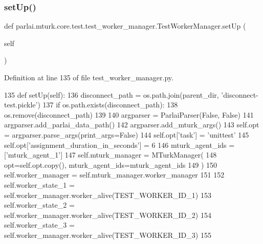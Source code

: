 \subsubsection{\texorpdfstring{set\+Up()}{setUp()}}
{\footnotesize\ttfamily def parlai.\+mturk.\+core.\+test.\+test\+\_\+worker\+\_\+manager.\+Test\+Worker\+Manager.\+set\+Up (\begin{DoxyParamCaption}\item[{}]{self }\end{DoxyParamCaption})}



Definition at line 135 of file test\+\_\+worker\+\_\+manager.\+py.


\begin{DoxyCode}
135     \textcolor{keyword}{def }setUp(self):
136         disconnect\_path = os.path.join(parent\_dir, \textcolor{stringliteral}{'disconnect-test.pickle'})
137         \textcolor{keywordflow}{if} os.path.exists(disconnect\_path):
138             os.remove(disconnect\_path)
139 
140         argparser = ParlaiParser(\textcolor{keyword}{False}, \textcolor{keyword}{False})
141         argparser.add\_parlai\_data\_path()
142         argparser.add\_mturk\_args()
143         self.opt = argparser.parse\_args(print\_args=\textcolor{keyword}{False})
144         self.opt[\textcolor{stringliteral}{'task'}] = \textcolor{stringliteral}{'unittest'}
145         self.opt[\textcolor{stringliteral}{'assignment\_duration\_in\_seconds'}] = 6
146         mturk\_agent\_ids = [\textcolor{stringliteral}{'mturk\_agent\_1'}]
147         self.mturk\_manager = MTurkManager(
148             opt=self.opt.copy(), mturk\_agent\_ids=mturk\_agent\_ids
149         )
150         self.worker\_manager = self.mturk\_manager.worker\_manager
151 
152         self.worker\_state\_1 = self.worker\_manager.worker\_alive(TEST\_WORKER\_ID\_1)
153         self.worker\_state\_2 = self.worker\_manager.worker\_alive(TEST\_WORKER\_ID\_2)
154         self.worker\_state\_3 = self.worker\_manager.worker\_alive(TEST\_WORKER\_ID\_3)
155 
\end{DoxyCode}
\mbox{\label{classparlai_1_1mturk_1_1core_1_1test_1_1test__worker__manager_1_1TestWorkerManager_a0cd2e2b8e0b7621c3a3e1b6a9e124ebb}} 
